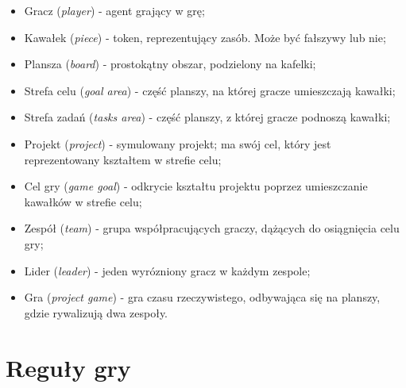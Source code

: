 \documentclass[a4paper]{article}
\begin{document}
\begin{itemize}
\item
  Gracz (\emph{player}) - agent grający w grę;
\item
  Kawałek (\emph{piece}) - token, reprezentujący zasób. Może być fałszywy lub nie;
\item
  Plansza (\emph{board}) - prostokątny obszar, podzielony na kafelki;
\item
  Strefa celu (\emph{goal area}) - część planszy, na której gracze umieszczają kawałki;
\item
  Strefa zadań (\emph{tasks area}) - część planszy, z której gracze podnoszą kawałki;
\item
  Projekt (\emph{project}) - symulowany projekt; ma swój cel, który jest reprezentowany kształtem w strefie celu;
\item
  Cel gry (\emph{game goal}) - odkrycie kształtu projektu poprzez umieszczanie kawałków w strefie celu;
\item
  Zespół (\emph{team}) - grupa współpracujących graczy, dążących do osiągnięcia celu gry;
\item
  Lider (\emph{leader}) - jeden wyrózniony gracz w każdym zespole;
\item
  Gra (\emph{project game}) - gra czasu rzeczywistego, odbywająca się na planszy, gdzie rywalizują dwa zespoły.
\end{itemize}

\section{Reguły gry}
\end{document}
